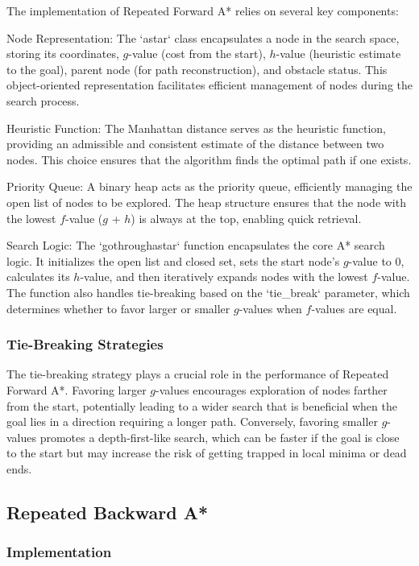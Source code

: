 \documentclass[12pt]{article}
\begin{document}
The implementation of Repeated Forward A* relies on several key components:

Node Representation: 
The `astar` class encapsulates a node in the search space, 
storing its coordinates, 
$g$-value (cost from the start), 
$h$-value (heuristic estimate to the goal), 
parent node (for path reconstruction), 
and obstacle status. 
This object-oriented representation facilitates efficient management of nodes during the search process.

Heuristic Function: 
The Manhattan distance serves as the heuristic function, 
providing an admissible and consistent estimate of the distance between two nodes. 
This choice ensures that the algorithm finds the optimal path if one exists.

Priority Queue: 
A binary heap acts as the priority queue, 
efficiently managing the open list of nodes to be explored. 
The heap structure ensures that the node with the lowest $f$-value 
($g$ + $h$) 
is always at the top, enabling quick retrieval.

Search Logic: 
The `gothroughastar` function encapsulates the core A* search logic. 
It initializes the open list and closed set, 
sets the start node's $g$-value to 0, 
calculates its $h$-value, 
and then iteratively expands nodes with the lowest $f$-value. 
The function also handles tie-breaking based on the `tie\_break` parameter, 
which determines whether to favor larger or smaller $g$-values when $f$-values are equal.

\subsubsection{Tie-Breaking Strategies}

The tie-breaking strategy plays a crucial role in the performance of Repeated Forward A*. 
Favoring larger $g$-values encourages exploration of nodes farther from the start, 
potentially leading to a wider search that is beneficial when the goal lies in a direction requiring a longer path. 
Conversely, 
favoring smaller $g$-values promotes a depth-first-like search, 
which can be faster if the goal is close to the start but may increase the risk of getting trapped in local minima or dead ends.

\subsection{Repeated Backward A*}

\subsubsection{Implementation}
\end{document}
